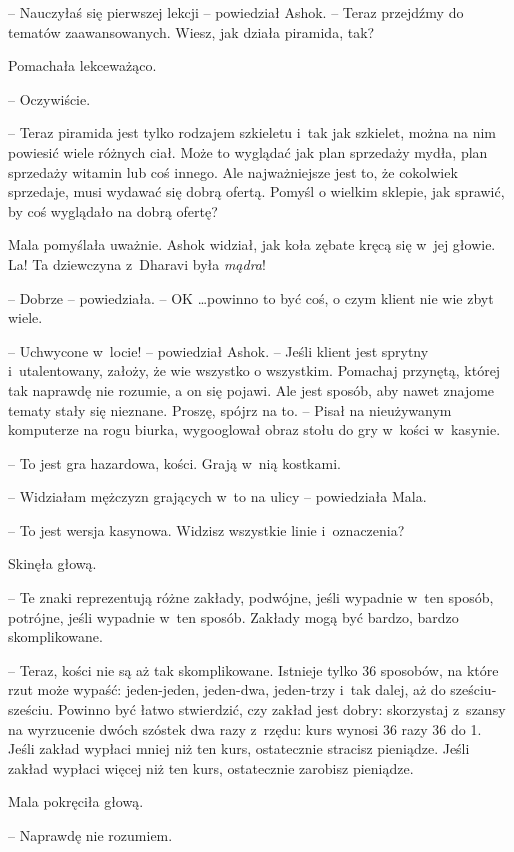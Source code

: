 \documentclass[oneside,polish,11pt,rmheadings]{mwbk}
\begin{document}
-- Nauczyłaś się pierwszej lekcji -- powiedział Ashok. -- Teraz przejdźmy do tematów zaawansowanych. Wiesz, jak działa piramida, tak?

Pomachała lekceważąco.

-- Oczywiście. 

-- Teraz piramida jest tylko rodzajem szkieletu i~tak jak szkielet, można na nim powiesić wiele różnych ciał. Może to wyglądać jak plan sprzedaży mydła, plan sprzedaży witamin lub coś innego. Ale najważniejsze jest to, że cokolwiek sprzedaje, musi wydawać się dobrą ofertą. Pomyśl o wielkim sklepie, jak sprawić, by coś wyglądało na dobrą ofertę?

Mala pomyślała uważnie. Ashok widział, jak koła zębate kręcą się w~jej głowie. La! Ta dziewczyna z~Dharavi była \textit{mądra}!

-- Dobrze -- powiedziała. -- OK  \ldots  powinno to być coś, o czym klient nie wie zbyt wiele.

-- Uchwycone w~locie! -- powiedział Ashok. -- Jeśli klient jest sprytny i~utalentowany, założy, że wie wszystko o wszystkim. Pomachaj przynętą, której tak naprawdę nie rozumie, a on się pojawi. Ale jest sposób, aby nawet znajome tematy stały się nieznane. Proszę, spójrz na to. -- Pisał na nieużywanym komputerze na rogu biurka, wygooglował obraz stołu do gry w~kości w~kasynie.

-- To jest gra hazardowa, kości. Grają w~nią kostkami.

-- Widziałam mężczyzn grających w~to na ulicy -- powiedziała Mala.

-- To jest wersja kasynowa. Widzisz wszystkie linie i~oznaczenia?

Skinęła głową.

-- Te znaki reprezentują różne zakłady, podwójne, jeśli wypadnie w~ten sposób, potrójne, jeśli wypadnie w~ten sposób. Zakłady mogą być bardzo, bardzo skomplikowane.

-- Teraz, kości nie są aż tak skomplikowane. Istnieje tylko 36 sposobów, na które rzut może wypaść: jeden-jeden, jeden-dwa, jeden-trzy i~tak dalej, aż do sześciu-sześciu. Powinno być łatwo stwierdzić, czy zakład jest dobry: skorzystaj z~szansy na wyrzucenie dwóch szóstek dwa razy z~rzędu: kurs wynosi 36 razy 36 do 1. Jeśli zakład wypłaci mniej niż ten kurs, ostatecznie stracisz pieniądze. Jeśli zakład wypłaci więcej niż ten kurs, ostatecznie zarobisz pieniądze.

Mala pokręciła głową. 

-- Naprawdę nie rozumiem.
\end{document}
